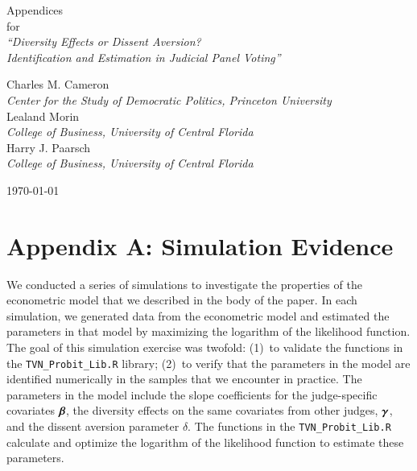 \documentclass[11pt]{paper}
\begin{document}
\phantom{0}
\vspace{1.0in}


\begin{centering}

{\huge 
Appendices  \\
\bigskip
for \\
\bigskip
{\it ``Diversity Effects or Dissent Aversion? \\
Identification and Estimation in Judicial Panel Voting''} \\
}

\vspace{1.25in}


{\large 
Charles M. Cameron \\
{\it Center for the Study of Democratic Politics, Princeton University} \\
\medskip
Lealand Morin \\
{\it College of Business, University of Central Florida} \\
\medskip
Harry J. Paarsch \\
{\it College of Business, University of Central Florida} \\
}

\vspace{1.25in}



\today

\end{centering}


\pagebreak

\section*{Appendix A: Simulation Evidence}

We conducted a series of simulations to investigate the properties of the 
econometric model that we described in the body of the paper. 
In each simulation, we generated data from the econometric model and estimated 
the parameters in that model by maximizing the logarithm of the likelihood 
function. 
The goal of this simulation exercise was twofold: (1)~to validate the 
functions in the \texttt{TVN\_Probit\_Lib.R} library; (2)~to verify that 
the parameters in the model are identified numerically in the samples that
we encounter in practice.
The parameters in the model include the slope coefficients for the 
judge-specific covariates $\boldsymbol{\beta}$, the diversity effects on the same 
covariates from other judges, $\boldsymbol{\gamma}$, and the dissent aversion parameter
$\delta$. 
The functions in the \texttt{TVN\_Probit\_Lib.R} calculate and optimize the 
logarithm of the likelihood function to estimate these parameters. 
\end{document}
